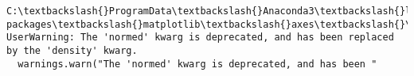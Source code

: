 \documentclass[11pt]{article}
\begin{document}
    \begin{Verbatim}[commandchars=\\\{\}]
C:\textbackslash{}ProgramData\textbackslash{}Anaconda3\textbackslash{}lib\textbackslash{}site-packages\textbackslash{}matplotlib\textbackslash{}axes\textbackslash{}\_axes.py:6462: UserWarning: The 'normed' kwarg is deprecated, and has been replaced by the 'density' kwarg.
  warnings.warn("The 'normed' kwarg is deprecated, and has been "

    \end{Verbatim}

    \begin{center}
    \end{center}
    { \hspace*{\fill} \\}
    
    \begin{center}
    \end{center}
    { \hspace*{\fill} \\}
    
    \begin{center}
    \end{center}
    { \hspace*{\fill} \\}
    
    \begin{center}
    \end{center}
    { \hspace*{\fill} \\}
    
    \begin{center}
    \end{center}
    { \hspace*{\fill} \\}
    
    \begin{center}
    \end{center}
    { \hspace*{\fill} \\}
    
\end{document}
